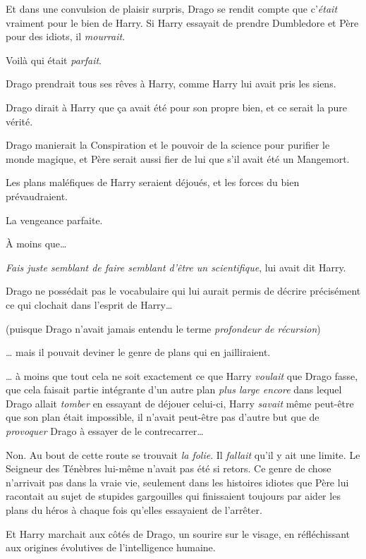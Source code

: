 Et dans une convulsion de plaisir surpris, Drago se rendit compte que c'\emph{était} vraiment pour le bien de Harry.
Si Harry essayait de prendre Dumbledore et Père pour des idiots, il \emph{mourrait}.

Voilà qui était \emph{parfait}.

Drago prendrait tous ses rêves à Harry, comme Harry lui avait pris les siens.

Drago dirait à Harry que ça avait été pour son propre bien, et ce serait la pure vérité.

Drago manierait la Conspiration et le pouvoir de la science pour purifier le monde magique, et Père serait aussi fier de lui que s'il avait été un Mangemort.

Les plans maléfiques de Harry seraient déjoués, et les forces du bien prévaudraient.

La vengeance parfaite.

À moins que…

\emph{Fais juste semblant de faire semblant d'être un scientifique}, lui avait dit Harry.

Drago ne possédait pas le vocabulaire qui lui aurait permis de décrire précisément ce qui clochait dans l'esprit de Harry…

(puisque Drago n'avait jamais entendu le terme \emph{profondeur de récursion})

… mais il pouvait deviner le genre de plans qui en jailliraient.

… à moins que tout cela ne soit exactement ce que Harry \emph{voulait} que Drago fasse, que cela faisait partie intégrante d'un autre plan \emph{plus large encore} dans lequel Drago allait \emph{tomber} en essayant de déjouer celui-ci, Harry \emph{savait} même peut-être que son plan était impossible, il n'avait peut-être pas d'autre but que de \emph{provoquer} Drago à essayer de le contrecarrer…

Non. Au bout de cette route se trouvait \emph{la folie}.
Il \emph{fallait} qu'il y ait une limite.
Le Seigneur des Ténèbres lui-même n'avait pas été si retors.
Ce genre de chose n'arrivait pas dans la vraie vie, seulement dans les histoires idiotes que Père lui racontait au sujet de stupides gargouilles qui finissaient toujours par aider les plans du héros à chaque fois qu'elles essayaient de l'arrêter.

\later

Et Harry marchait aux côtés de Drago, un sourire sur le visage, en réfléchissant aux origines évolutives de l'intelligence humaine.

